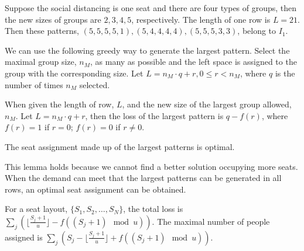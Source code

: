 \begin{example}
  Suppose the social distancing is one seat and there are four types of groups, then the new sizes of groups are $2, 3, 4, 5$, respectively. The length of one row is $L = 21$. Then these patterns, $(5, 5, 5, 5, 1), (5, 4, 4, 4, 4),(5, 5, 5, 3, 3)$, belong to $I_1$. 
\end{example}


We can use the following greedy way to generate the largest pattern. Select the maximal group size, $n_M$, as many as possible and the left space is assigned to the group with the corresponding size. Let $L = n_M \cdot q + r, 0 \leq r < n_M$, where $q$ is the number of times $n_M$ selected. 


\begin{lem}
When given the length of row, $L$, and the new size of the largest group allowed, $n_M$. Let $L = n_M \cdot q + r$, then the loss of the largest pattern is $q - f(r)$, where $f(r) =1$ if $r=0$; $f(r) =0$ if $r \neq 0$.
\end{lem}

\begin{lem}
The seat assignment made up of the largest patterns is optimal.
\end{lem}

This lemma holds because we cannot find a better solution occupying more seats. When the demand can meet that the largest patterns can be generated in all rows, an optimal seat assignment can be obtained.

\begin{prop}
For a seat layout, $\{S_1, S_2, \ldots, S_{N}\}$, the total loss is $\sum_{j} (\lfloor \frac{S_j+1}{u} \rfloor - f((S_j +1)\mod u))$. The maximal number of people assigned is $\sum_{j} (S_j - \lfloor \frac{S_j+1}{u} \rfloor + f((S_j +1)\mod u))$.
\end{prop}


